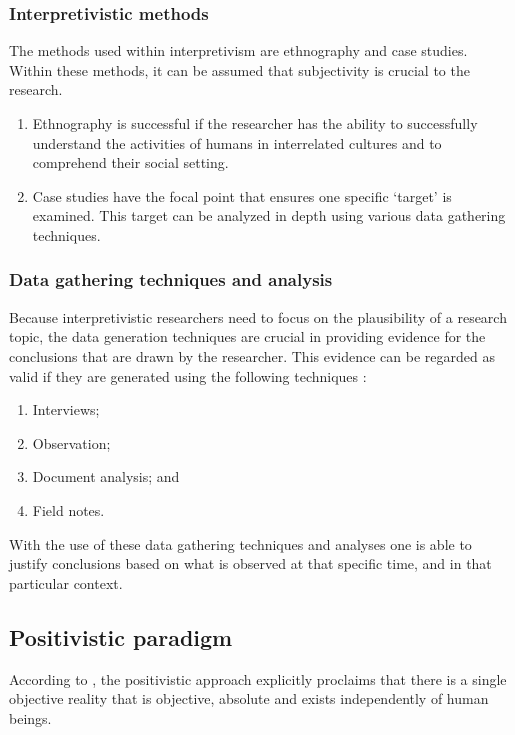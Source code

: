 \subsubsection{Interpretivistic methods}
The methods used within interpretivism are ethnography and case studies. Within these methods, it can be assumed that subjectivity is crucial to the research. 
\begin{enumerate}[label=\roman*.]
	\item Ethnography is successful if the researcher has the ability to successfully understand the activities of humans in interrelated cultures and to comprehend their social setting.
	\item Case studies have the focal point that ensures one specific ‘target’ is examined. This target can be analyzed in depth using various data gathering techniques.
\end{enumerate}

\subsubsection{Data gathering techniques and analysis}
Because interpretivistic researchers need to focus on the plausibility of a research topic, the data generation techniques are crucial in providing evidence for the conclusions that are drawn by the researcher. This evidence can be regarded as valid if they are generated using the following techniques \citep{OatesJ2006}:
\begin{enumerate}[label=\roman*.]
	\item Interviews;
	\item Observation;
	\item Document analysis; and
	\item Field notes.
\end{enumerate}

With the use of these data gathering techniques and analyses one is able to justify conclusions based on what is observed at that specific time, and in that particular context.

\subsection{Positivistic paradigm}
According to \cite{DeVilliers2005}, the positivistic approach explicitly proclaims that there is a single objective reality that is objective, absolute and exists independently of human beings. 

